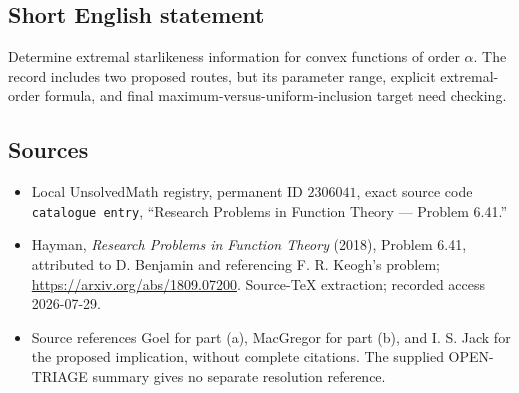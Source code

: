 \documentclass[11pt]{article}
\begin{document}
\subsection{Short English statement}
Determine extremal starlikeness information for convex functions of order \(\alpha\). The record includes two proposed routes, but its parameter range, explicit extremal-order formula, and final maximum-versus-uniform-inclusion target need checking.
\subsection{Sources}
\begin{itemize}
\item Local UnsolvedMath registry, permanent ID \(2306041\), exact source code \texttt{catalogue entry}, ``Research Problems in Function Theory --- Problem 6.41.''
\item Hayman, \emph{Research Problems in Function Theory} (2018), Problem 6.41, attributed to D. Benjamin and referencing F. R. Keogh's problem; \url{https://arxiv.org/abs/1809.07200}. Source-TeX extraction; recorded access 2026-07-29.
\item Source references Goel for part (a), MacGregor for part (b), and I. S. Jack for the proposed implication, without complete citations. The supplied OPEN-TRIAGE summary gives no separate resolution reference.
\end{itemize}
\end{document}
